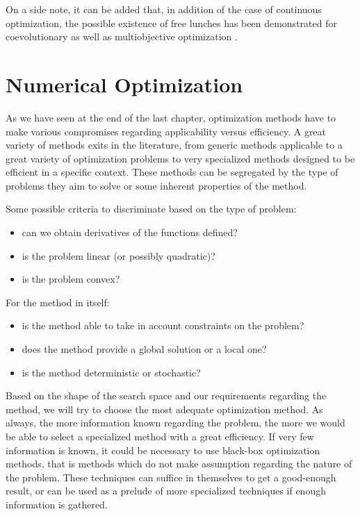 On a side note, it can be added that, in addition of the case of continuous optimization, the possible existence of free lunches has been demonstrated for coevolutionary \cite{1545946} as well as multiobjective optimization \cite{1299403}.

\chapter{Numerical Optimization}

As we have seen at the end of the last chapter, optimization methods have to make various compromises regarding applicability versus efficiency.  A great variety of methods exits in the literature, from generic methods applicable to a great variety of optimization problems to very specialized methods designed to be efficient in a specific context. These methods can be segregated by the type of problems they aim to solve or some inherent properties of the method.

Some possible criteria to discriminate based on the type of problem:
\begin{itemize}
\item can we obtain derivatives of the functions defined?
\item is the problem linear (or possibly quadratic)?
\item is the problem convex?
\end{itemize}

For the method in itself:
\begin{itemize}
\item is the method able to take in account constraints on the problem?
\item does the method provide a global solution or a local one?
\item is the method deterministic or stochastic?
\end{itemize}

Based on the shape of the search space and our requirements regarding the method, we will try to choose the most adequate optimization method. As always, the more information known regarding the problem, the more we would be able to select a specialized method with a great efficiency. If very few information is known, it could be necessary to use black-box optimization methods, that is methods which do not make assumption regarding the nature of the problem. These techniques can suffice in themselves to get a good-enough result, or can be used as a prelude of more specialized techniques if enough information is gathered.

